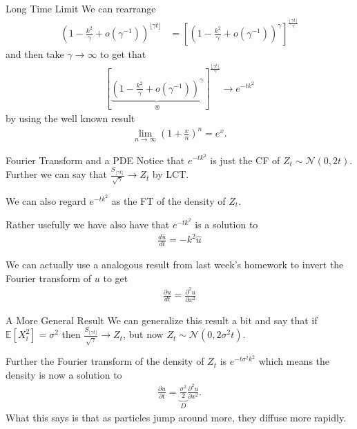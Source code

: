 \documentclass[pdf]{beamer}
\newcommand{\lra}{\longrightarrow}
\begin{document}
\begin{frame}{Long Time Limit}
    We can rearrange
    \begin{align}
        \left( 1- \frac{k^2}{\gamma} + o(\gamma^{-1}) \right)^{\lfloor \gamma t \rfloor}
        &= \left[ \left( 1- \frac{k^2}{\gamma} + o(\gamma^{-1}) \right)^\gamma \right]^\frac{{\lfloor \gamma t \rfloor}}{\gamma}
    \end{align}
    and then take $ \gamma \lra \infty $ to get that
    \begin{align}
    \left[ \underbrace{\left( 1- \frac{k^2}{\gamma} + o(\gamma^{-1}) \right)^\gamma}_{\circledast} \right]^\frac{{\lfloor \gamma t \rfloor}}{\gamma} \lra e^{-tk^2}
    \end{align}
    by using the well known result
    \begin{align}
        \lim_{n \lra \infty} \left(1 + \frac{x}{n}\right)^n = e^x.
    \end{align}
\end{frame}


\begin{frame}{Fourier Transform and a PDE}
    Notice that $ e^{-tk^2} $ is just the CF of $Z_t \sim \mathcal{N}(0,2t) $. Further we can say that $ \frac{S_{\lfloor \gamma t \rfloor}}{\sqrt{\gamma}} \lra Z_t $ by LCT.
    
    
    We can also regard $ e^{-tk^2} $ as the FT of the density of $ Z_t $.
    
    Rather usefully we have also have that $ e^{-tk^2} $ is a solution to 
    \begin{align}
        \frac{d\hat{u}}{dt} = -k^2\hat{u}
    \end{align}
    
    We can actually use a analogous result from last week's homework to invert the Fourier transform of $ u $ to get
    \begin{align}
        \frac{\partial u}{dt} = \frac{\partial^2 u}{\partial x^2}
    \end{align}
\end{frame}

\begin{frame}{A More General Result}
    We can generalize this result a bit and say that if $ \mathbb{E}[X_i^2] = \sigma^2 $
    then $ \frac{S_{\lfloor \gamma t \rfloor}}{\sqrt{\gamma}} \lra Z_{t} $, but now $ Z_t \sim \mathcal{N}(0,2\sigma^2 t) $.
    
    Further the Fourier transform of the density of $ Z_t $ is $ e^{-t\sigma^2k^2} $
    which means the density is now a solution to
    \begin{align}
        \frac{\partial u}{\partial t} = \underbrace{\frac{\sigma^2}{2}}_{D}\frac{\partial^2 u}{\partial x^2}.
    \end{align}
    What this says is that as particles jump around more, they diffuse more rapidly.
\end{frame}
\end{document}
